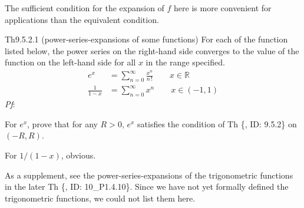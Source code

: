 \documentclass{article}
\begin{document}
\begin{Rmk}{}
    The sufficient condition for the expansion of $f$ here is more convenient for applications than the equivalent condition.
\end{Rmk}

\begin{Th}{Th9.5.2.1 (power-series-expansions of some functions)}
    For each of the function listed below, the power series on the right-hand side converges to the value of the function on the left-hand side for all $x$ in the range specified.
    $$
    \begin{aligned}
        e^x &= \sum_{n=0}^{\infty} \frac{x^n}{n\,!} \qquad x\in\mathbb{R} \\
        \frac{1}{1-x} &= \sum_{n=0}^{\infty} x^n \qquad x\in (-1, 1) 
    \end{aligned}
    $$
    \tcblower
    \textit{Pf}: 
    \begin{compactenum}
        \item For $e^x$, prove that for any $R>0$, $e^x$ satisfies the condition of Th \{, ID: 9.5.2\} on $(-R, R)$.
        \item For $1/(1-x)$, obvious.
    \end{compactenum}
\end{Th}

\begin{Rmk}{}
    As a supplement, see the power-series-expansions of the trigonometric functions in the later Th \{, ID: 10\_P1.4.10\}. Since we have not yet formally defined the trigonometric functions, we could not list them here.
\end{Rmk}
\end{document}
